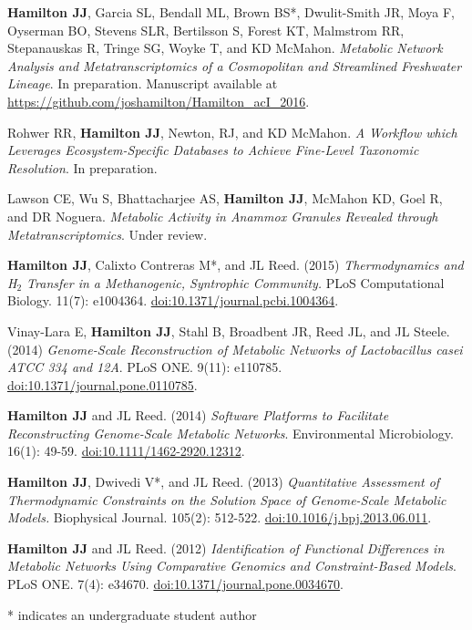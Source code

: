 \documentclass[letterpaper,11pt]{article}
\newlength{\outerbordwidth}
\newcommand{\resheading}[1]{\vspace{8pt}
  \parbox{\textwidth}{
  \setlength{\FrameSep}{\outerbordwidth}
\setlength{\fboxsep}{0pt}
\framebox[\textwidth][l]{\setlength{\fboxsep}{4pt}\fcolorbox{shadecolorB}{shadecolorB}{\textbf{\sffamily{\mbox{~}\makebox[6.262in][l]{\large #1} \vphantom{p\^{E}}}}}}
  }
  \vspace{-5pt}
}
\begin{document}
\resheading{Publications}
\begin{etaremune}[itemsep=-2pt]
	\item \textbf{Hamilton JJ}, Garcia SL, Bendall ML, Brown BS*, Dwulit-Smith JR, Moya F, Oyserman BO, Stevens SLR, Bertilsson S, Forest KT, Malmstrom RR, Stepanauskas R, Tringe SG, Woyke T, and KD McMahon. \emph{Metabolic Network Analysis and Metatranscriptomics of a Cosmopolitan and Streamlined Freshwater Lineage}. In preparation. Manuscript available at \url{https://github.com/joshamilton/Hamilton_acI_2016}.
	\item Rohwer RR, \textbf{Hamilton JJ}, Newton, RJ, and KD McMahon. \emph{A Workflow which Leverages Ecosystem-Specific Databases to Achieve Fine-Level Taxonomic Resolution}. In preparation.
	\item Lawson CE, Wu S, Bhattacharjee AS, \textbf{Hamilton JJ}, McMahon KD, Goel R, and DR Noguera. \emph{Metabolic Activity in Anammox Granules Revealed through Metatranscriptomics}. Under review.
	\item \textbf{Hamilton JJ}, Calixto Contreras M*, and JL Reed. (2015) \emph{Thermodynamics and H$_2$ Transfer in a Methanogenic, Syntrophic Community.} PLoS Computational Biology. 11(7): e1004364. \href{http://journals.plos.org/ploscompbiol/article?id=10.1371/journal.pcbi.1004364}{doi:10.1371/journal.pcbi.1004364}.
	\item Vinay-Lara E, \textbf{Hamilton JJ}, Stahl B, Broadbent JR, Reed JL, and JL Steele. (2014) \emph{Genome-Scale Reconstruction of Metabolic Networks of Lactobacillus casei ATCC 334 and 12A}. PLoS ONE. 9(11): e110785. \href{http://journals.plos.org/plosone/article?id=10.1371/journal.pone.0110785}{doi:10.1371/journal.pone.0110785}.
	\item \textbf{Hamilton JJ} and JL Reed. (2014) \emph{Software Platforms to Facilitate Reconstructing Genome-Scale Metabolic Networks}. Environmental Microbiology. 16(1): 49-59. \href{http://onlinelibrary.wiley.com/doi/10.1111/1462-2920.12312/abstract}{doi:10.1111/1462-2920.12312}.
	\item \textbf{Hamilton JJ}, Dwivedi V*, and JL Reed. (2013) \emph{Quantitative Assessment of Thermodynamic Constraints on the Solution Space of Genome-Scale Metabolic Models.} Biophysical Journal. 105(2): 512-522. \href{http://www.cell.com/biophysj/abstract/S0006-3495%2813%2900685-1}{doi:10.1016/j.bpj.2013.06.011}.
	\item \textbf{Hamilton JJ} and JL Reed. (2012) \emph{Identification of Functional Differences in Metabolic Networks Using Comparative Genomics and Constraint-Based Models}. PLoS ONE. 7(4): e34670. \href{http://journals.plos.org/plosone/article?id=10.1371/journal.pone.0034670}{doi:10.1371/journal.pone.0034670}.
\end{etaremune}
* indicates an undergraduate student author
\end{document}
